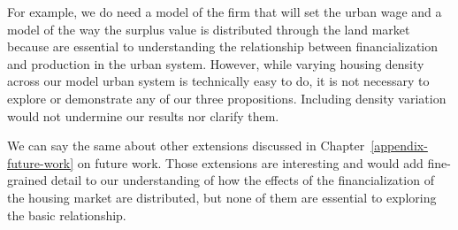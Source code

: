 For example, we do need a model of the firm that will set the urban wage and a model of the way the surplus value is distributed through the land market because are essential to understanding the relationship between financialization and production in the urban system. However,
while varying housing density across our model urban system is technically easy to do, it is not necessary to explore or demonstrate any of our three propositions. Including density variation would not undermine our results nor clarify them. %

We can say the same about other extensions discussed in Chapter~\ref{appendix-future-work} on future work. %
Those extensions are interesting and would add fine-grained detail to our understanding of how the effects of the financialization of the housing market are distributed, but none of them are essential to exploring the basic relationship. %

